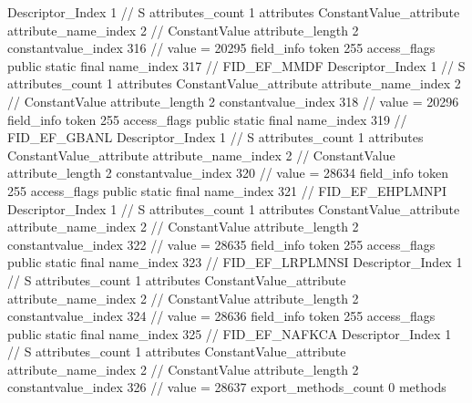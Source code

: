 {{{{{				Descriptor_Index	1		// S
				attributes_count	1
				attributes {
				ConstantValue_attribute {
					attribute_name_index	2		// ConstantValue
					attribute_length	2
					constantvalue_index	316		// value = 20295
				}
				}
			}
			field_info {
				token	255
				access_flags	public static final
				name_index	317		// FID_EF_MMDF
				Descriptor_Index	1		// S
				attributes_count	1
				attributes {
				ConstantValue_attribute {
					attribute_name_index	2		// ConstantValue
					attribute_length	2
					constantvalue_index	318		// value = 20296
				}
				}
			}
			field_info {
				token	255
				access_flags	public static final
				name_index	319		// FID_EF_GBANL
				Descriptor_Index	1		// S
				attributes_count	1
				attributes {
				ConstantValue_attribute {
					attribute_name_index	2		// ConstantValue
					attribute_length	2
					constantvalue_index	320		// value = 28634
				}
				}
			}
			field_info {
				token	255
				access_flags	public static final
				name_index	321		// FID_EF_EHPLMNPI
				Descriptor_Index	1		// S
				attributes_count	1
				attributes {
				ConstantValue_attribute {
					attribute_name_index	2		// ConstantValue
					attribute_length	2
					constantvalue_index	322		// value = 28635
				}
				}
			}
			field_info {
				token	255
				access_flags	public static final
				name_index	323		// FID_EF_LRPLMNSI
				Descriptor_Index	1		// S
				attributes_count	1
				attributes {
				ConstantValue_attribute {
					attribute_name_index	2		// ConstantValue
					attribute_length	2
					constantvalue_index	324		// value = 28636
				}
				}
			}
			field_info {
				token	255
				access_flags	public static final
				name_index	325		// FID_EF_NAFKCA
				Descriptor_Index	1		// S
				attributes_count	1
				attributes {
				ConstantValue_attribute {
					attribute_name_index	2		// ConstantValue
					attribute_length	2
					constantvalue_index	326		// value = 28637
				}
				}
			}
			}
			export_methods_count	0
			methods {
			}
		}
	}
}
